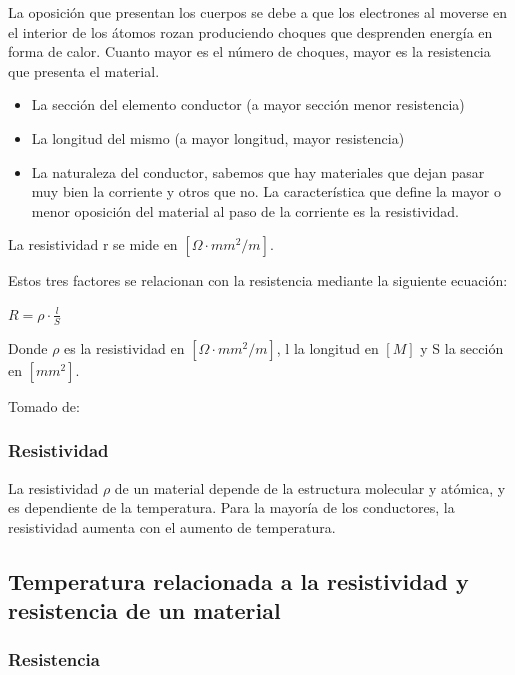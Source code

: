 \documentclass[letterpaper, 12pt]{report}
\begin{document}
La oposición que presentan los cuerpos se debe a que los electrones al moverse
en el interior de los átomos rozan produciendo choques que desprenden energía
en forma de calor. Cuanto mayor es el número de choques, mayor es la
resistencia que presenta el material.

\begin{itemize}
	\item La sección del elemento conductor (a mayor sección menor resistencia)
	\item La longitud del mismo (a mayor longitud, mayor resistencia)
	\item La naturaleza del conductor, sabemos que hay materiales que dejan
	      pasar muy bien la corriente y otros que no. La característica que
	      define la mayor o menor oposición del material al paso de la corriente
	      es la resistividad.
\end{itemize}

La resistividad r se mide en $[\Omega \cdot mm^2 /m]$.

Estos tres factores se relacionan con la resistencia mediante la siguiente
ecuación:

\smallskip

$R = \rho \cdot \frac{l}{S}$

\smallskip

Donde $\rho$ es la resistividad en $[\Omega \cdot mm^2 /m]$, l la longitud
en $[M]$ y S la sección en $[mm^2]$.

Tomado de:~\cite{ResistenciaElectrica}

\subsubsection{Resistividad}

La resistividad $\rho$ de un material depende de la estructura molecular y
atómica, y es dependiente de la temperatura. Para la mayoría de los
conductores, la resistividad aumenta con el aumento de temperatura.
~\cite{KhanAcademyResistividad}

\subsection{Temperatura relacionada a la resistividad y resistencia de
	un material}

\subsubsection{Resistencia}
\end{document}
